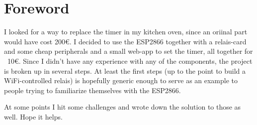 \section*{Foreword}
I looked for a way to replace the timer in my kitchen oven, since an oriinal part would have cost 200€. I decided to use the ESP2866 together with a relais-card and some cheap peripherals and a small web-app to set the timer, all together for ~10€. Since I didn't have any experience with any of the components, the project is broken up in several steps. At least the first steps (up to the point to build a WiFi-controlled relais) is hopefully generic enough to serve as an example to people trying to familiarize themselves with the ESP2866.

At some points I hit some challenges and wrote down the solution to those as well. Hope it helps.
